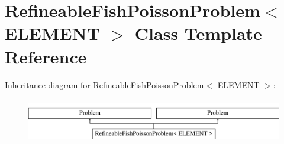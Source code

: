 \hypertarget{classRefineableFishPoissonProblem}{}\section{Refineable\+Fish\+Poisson\+Problem$<$ E\+L\+E\+M\+E\+NT $>$ Class Template Reference}
\label{classRefineableFishPoissonProblem}
Inheritance diagram for Refineable\+Fish\+Poisson\+Problem$<$ E\+L\+E\+M\+E\+NT $>$\+:\begin{figure}[H]
\begin{center}
\leavevmode
\includegraphics[height=2.000000cm]{classRefineableFishPoissonProblem}
\end{center}
\end{figure}
